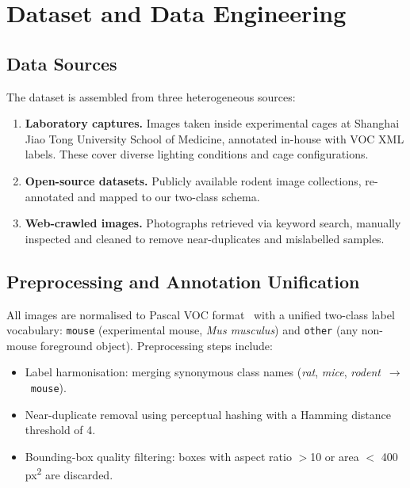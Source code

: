 \section{Dataset and Data Engineering}
\label{sec:dataset}

\subsection{Data Sources}

The dataset is assembled from three heterogeneous sources:

\begin{enumerate}[leftmargin=1.5em]
  \item \textbf{Laboratory captures.}
    Images taken inside experimental cages at Shanghai Jiao Tong University
    School of Medicine, annotated in-house with VOC XML labels.
    These cover diverse lighting conditions and cage configurations.

  \item \textbf{Open-source datasets.}
    Publicly available rodent image collections, re-annotated and mapped
    to our two-class schema.

  \item \textbf{Web-crawled images.}
    Photographs retrieved via keyword search, manually inspected and
    cleaned to remove near-duplicates and mislabelled samples.
\end{enumerate}

\subsection{Preprocessing and Annotation Unification}

All images are normalised to Pascal VOC format~\citep{everingham2010pascal}
with a unified two-class label vocabulary:
\texttt{mouse} (experimental mouse, \textit{Mus musculus}) and
\texttt{other} (any non-mouse foreground object).
Preprocessing steps include:

\begin{itemize}[leftmargin=1.5em]
  \item Label harmonisation: merging synonymous class names (\textit{rat},
    \textit{mice}, \textit{rodent}~$\to$~\texttt{mouse}).
  \item Near-duplicate removal using perceptual hashing with a Hamming
    distance threshold of 4.
  \item Bounding-box quality filtering: boxes with aspect ratio $>$10 or
    area $<$ 400\,px\textsuperscript{2} are discarded.
\end{itemize}

